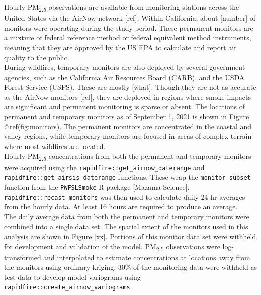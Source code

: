 \documentclass[gmd, manuscript]{copernicus}
\begin{document}
Hourly PM\textsubscript{2.5} observations are available from monitoring
stations across the United States via the AirNow network {[}ref{]}.
Within California, about {[}number{]} of monitors were operating during
the study period. These permanent monitors are a mixture of federal
reference method or federal equivalent method instruments, meaning that
they are approved by the US EPA to calculate and report air quality to
the public.\\
During wildfires, temporary monitors are also deployed by several
government agencies, such as the California Air Resources Board (CARB),
and the USDA Forest Service (USFS). These are mostly {[}what{]}. Though
they are not as accurate as the AirNow monitors {[}ref{]}, they are
deployed in regions where smoke impacts are significant and permanent
monitoring is sparse or absent. The locations of permanent and temporary
monitors as of September 1, 2021 is shown in Figure @ref(fig:monitors).
The permanent monitors are concentrated in the coastal and valley
regions, while temporary monitors are focused in areas of complex
terrain where most wildfires are located.\\
Hourly PM\textsubscript{2.5} concentrations from both the permanent and
temporary monitors were acquired using the
\texttt{rapidfire::get\_airnow\_daterange} and
\texttt{rapidfire::get\_airsis\_daterange} functions. These wrap the
\texttt{monitor\_subset} function from the \texttt{PWFSLSmoke} R package
{[}Mazama Science{]}. \texttt{rapidfire::recast\_monitors} was then used
to calculate daily 24-hr averages from the hourly data. At least 16
hours are required to produce an average.\\
The daily average data from both the permanent and temporary monitors
were combined into a single data set. The spatial extent of the monitors
used in this analysis are shown in Figure {[}xx{]}. Portions of this
monitor data set were withheld for development and validation of the
model. PM\textsubscript{2.5} observations were log-transformed and
interpolated to estimate concentrations at locations away from the
monitors using ordinary kriging. 30\% of the monitoring data were
withheld as test data to develop model variograms using
\texttt{rapidfire::create\_airnow\_variograms}.
\end{document}
